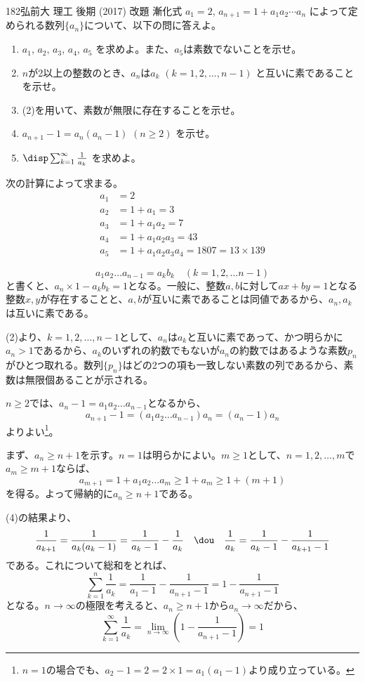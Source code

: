 \begin{prob}{182}{}{弘前大 理工 後期 (2017) 改題}
 漸化式 $a_1=2$, $a_{n+1}=1+a_1a_2\cdots a_n$ によって定められる数列$\{a_n\}$について、以下の問に答えよ。
 \begin{enumerate}
  \item $a_1$, $a_2$, $a_3$, $a_4$, $a_5$ を求めよ。また、$a_5$は素数でないことを示せ。
  \item $n$が2以上の整数のとき、$a_n$は$a_k$ $(k=1, 2, \dots, n-1)$ と互いに素であることを示せ。
  \item (2)を用いて、素数が無限に存在することを示せ。
  \item $a_{n+1}-1=a_n(a_n-1)$ $(n\ge 2)$ を示せ。
  \item $\disp \sum_{k=1}^\infty \frac{1}{a_k}$ を求めよ。
 \end{enumerate}
\end{prob}
次の計算によって求まる。
\begin{align*}
 a_1&=2 \\
 a_2&=1+a_1=3 \\
 a_3&=1+a_1a_2=7 \\
 a_4&=1+a_1a_2a_3=43 \\
 a_5&=1+a_1a_2a_3a_4=1807=13\times 139
\end{align*}

\[ a_1a_2\dots a_{n-1}=a_kb_k \quad (k=1, 2, \dots n-1) \]
と書くと、$a_n\times 1-a_kb_k=1$となる。一般に、整数$a, b$に対して$ax+by=1$となる整数$x, y$が存在することと、$a, b$が互いに素であることは同値であるから、$a_n, a_k$は互いに素である。

(2)より、$k=1, 2, \dots, n-1$として、$a_n$は$a_k$と互いに素であって、かつ明らかに$a_n>1$であるから、$a_k$のいずれの約数でもないが$a_n$の約数ではあるような素数$p_n$がひとつ取れる。数列$\{p_n\}$はどの2つの項も一致しない素数の列であるから、素数は無限個あることが示される。

$n\ge 2$では、$a_n-1=a_1a_2\dots a_{n-1}$となるから、
\[ a_{n+1}-1=(a_1a_2\dots a_{n-1})a_n=(a_n-1)a_n \]
よりよい\footnote{$n=1$の場合でも、$a_2-1=2=2\times 1=a_1(a_1-1)$より成り立っている。}。

まず、$a_n\ge n+1$を示す。$n=1$は明らかによい。$m\ge 1$として、$n=1, 2, \dots, m$で$a_m\ge m+1$ならば、
\[ a_{m+1}=1+a_1a_2\dots a_m \ge 1+a_m \ge 1+(m+1) \]
を得る。よって帰納的に$a_n\ge n+1$である。

(4)の結果より、
\[ \frac{1}{a_{k+1}}=\frac{1}{a_k(a_k-1)}=\frac{1}{a_k-1}-\frac{1}{a_k} \quad\dou\quad \frac{1}{a_k}=\frac{1}{a_k-1}-\frac{1}{a_{k+1}-1} \]
である。これについて総和をとれば、
\[ \sum_{k=1}^n\frac{1}{a_k}=\frac{1}{a_1-1}-\frac{1}{a_{n+1}-1}=1-\frac{1}{a_{n+1}-1} \]
となる。$n\to\infty$の極限を考えると、$a_n\ge n+1$から$a_n\to\infty$だから、
\[ \sum_{k=1}^\infty\frac{1}{a_k}=\lim_{n\to\infty}\left(1-\frac{1}{a_{n+1}-1}\right)=1 \]